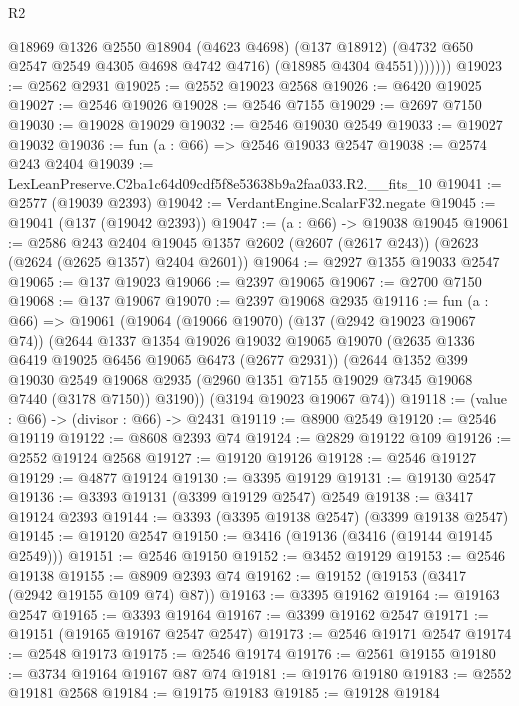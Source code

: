 \begin{lexlean}{R2}
\begin{coremodule}
              @18969
                @1326
                @2550
                @18904
                (@4623 @4698)
                (@137 @18912)
                (@4732 @650 @2547 @2549 @4305 @4698 @4742 @4716)
                (@18985 @4304 @4551)))))))
@19023 := @2562 @2931
@19025 := @2552 @19023 @2568
@19026 := @6420 @19025
@19027 := @2546 @19026
@19028 := @2546 @7155
@19029 := @2697 @7150
@19030 := @19028 @19029
@19032 := @2546 @19030 @2549
@19033 := @19027 @19032
@19036 := fun (a : @66) => @2546 @19033 @2547
@19038 := @2574 @243 @2404
@19039 := LexLeanPreserve.C2ba1c64d09cdf5f8e53638b9a2faa033.R2.__fits_10
@19041 := @2577 (@19039 @2393)
@19042 := VerdantEngine.ScalarF32.negate
@19045 := @19041 (@137 (@19042 @2393))
@19047 := (a : @66) -> @19038 @19045
@19061 := @2586
    @243
    @2404
    @19045
    @1357
    @2602
    (@2607 (@2617 @243))
    (@2623 (@2624 (@2625 @1357) @2404 @2601))
@19064 := @2927 @1355 @19033 @2547
@19065 := @137 @19023
@19066 := @2397 @19065
@19067 := @2700 @7150
@19068 := @137 @19067
@19070 := @2397 @19068 @2935
@19116 := fun (a : @66) =>
  @19061
    (@19064
      (@19066 @19070)
      (@137 (@2942 @19023 @19067 @74))
      (@2644
        @1337
        @1354
        @19026
        @19032
        @19065
        @19070
        (@2635 @1336 @6419 @19025 @6456 @19065 @6473 (@2677 @2931))
        (@2644
          @1352
          @399
          @19030
          @2549
          @19068
          @2935
          (@2960 @1351 @7155 @19029 @7345 @19068 @7440 (@3178 @7150))
          @3190))
      (@3194 @19023 @19067 @74))
@19118 := (value : @66) -> (divisor : @66) -> @2431
@19119 := @8900 @2549
@19120 := @2546 @19119
@19122 := @8608 @2393 @74
@19124 := @2829 @19122 @109
@19126 := @2552 @19124 @2568
@19127 := @19120 @19126
@19128 := @2546 @19127
@19129 := @4877 @19124
@19130 := @3395 @19129
@19131 := @19130 @2547
@19136 := @3393 @19131 (@3399 @19129 @2547) @2549
@19138 := @3417 @19124 @2393
@19144 := @3393 (@3395 @19138 @2547) (@3399 @19138 @2547)
@19145 := @19120 @2547
@19150 := @3416 (@19136 (@3416 (@19144 @19145 @2549)))
@19151 := @2546 @19150
@19152 := @3452 @19129
@19153 := @2546 @19138
@19155 := @8909 @2393 @74
@19162 := @19152 (@19153 (@3417 (@2942 @19155 @109 @74) @87))
@19163 := @3395 @19162
@19164 := @19163 @2547
@19165 := @3393 @19164
@19167 := @3399 @19162 @2547
@19171 := @19151 (@19165 @19167 @2547 @2547)
@19173 := @2546 @19171 @2547
@19174 := @2548 @19173
@19175 := @2546 @19174
@19176 := @2561 @19155
@19180 := @3734 @19164 @19167 @87 @74
@19181 := @19176 @19180
@19183 := @2552 @19181 @2568
@19184 := @19175 @19183
@19185 := @19128 @19184

\end{coremodule}
\end{lexlean}
